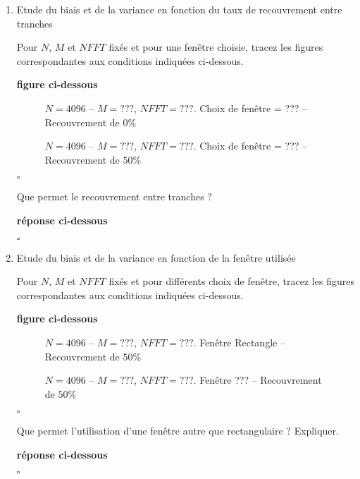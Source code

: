 \documentclass{article}
\newcommand{\debutrep}[1]{\color{blue}\begin{center} \hrulefill \textbf{ #1 } \hrulefill \end{center} }
\newcommand{\finrep}{\vspace*{5mm}\hfill $\square$\color{black}\vspace*{5mm}}
\begin{document}
\begin{enumerate}
\renewcommand{\theenumi}{\Alph{enumi}}

\item Etude du biais et de la variance en fonction du taux de recouvrement entre tranches

Pour $N$, $M$ et $NFFT$ fixés et pour une  fenêtre choisie,  tracez les figures correspondantes aux conditions indiquées ci-dessous.

\debutrep{figure ci-dessous}
\begin{figure}[h]

\caption{$N = 4096$ -- $M = ???$, $NFFT = ???$. Choix de fenêtre = ??? -- Recouvrement de $0\%$}
\end{figure}

\begin{figure}[h]

\caption{$N = 4096$ -- $M = ???$, $NFFT = ???$. Choix de fenêtre = ??? -- Recouvrement de $50\%$}
\end{figure}

\finrep

Que permet le recouvrement entre tranches ?

\debutrep{réponse ci-dessous}

\finrep

\item Etude du biais et de la variance en fonction de la fenêtre utilisée

Pour $N$, $M$ et $NFFT$ fixés et pour différents choix de fenêtre,  tracez les figures correspondantes aux conditions indiquées ci-dessous.

\debutrep{figure ci-dessous}
\begin{figure}[h]

\caption{$N = 4096$ -- $M = ???$, $NFFT = ???$. Fenêtre Rectangle -- Recouvrement de $50\%$}
\end{figure}

\begin{figure}[h]

\caption{$N = 4096$ -- $M = ???$, $NFFT = ???$. Fenêtre ??? -- Recouvrement de $50\%$}
\end{figure}

\finrep

Que permet l'utilisation d'une fenêtre autre que rectangulaire ? Expliquer.

\debutrep{réponse ci-dessous}

\finrep

\end{enumerate}
\end{document}
